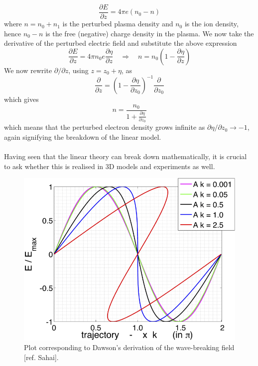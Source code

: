 \documentclass[%
onecolumn, notitlepage,
 amsmath,amssymb,
 aps,
]{article}
\begin{document}
\begin{itemize}
\begin{equation}
\frac{\partial E}{\partial z}=4\pi e(n_0-n)
\end{equation}
where $n=n_0+n_1$ is the perturbed plasma density and $n_0$ is the ion density, hence $n_0-n$ is the free (negative) charge density in the plasma. We now take the derivative of the perturbed electric field and substitute the above expression
\begin{equation}
\frac{\partial E}{\partial z}=4\pi n_0 e \frac{\partial \eta}{\partial z} \quad \Rightarrow \quad n=n_0\left(1-\frac{\partial \eta}{\partial z}\right)
\end{equation}
We now rewrite $\partial /\partial z$, using $z=z_0+\eta$, as
\begin{equation}
\frac{\partial}{\partial z}=\left(1-\frac{\partial \eta }{\partial z_0}\right)^{-1}\frac{\partial}{\partial z_0}
\end{equation}
which gives
\begin{equation}
n=\frac{n_0}{1+\frac{\partial \eta }{\partial z_0}}
 \end{equation} 
 which means that the perturbed electron density grows infinite as $\partial \eta/\partial z_0\to -1$, again signifying the breakdown of the linear model.\\
\\
Having seen that the linear theory can break down mathematically, it is crucial to ask whether this is realised in 3D models and experiments as well. 
\begin{figure}
\centering
\includegraphics[scale=1]{SahaiThesisPlot.png}
\caption{Plot corresponding to Dawson's derivation of the wave-breaking field [ref. Sahai].}
\label{DawsonCriterionPlot}
\end{figure}
\end{itemize}
\end{document}
